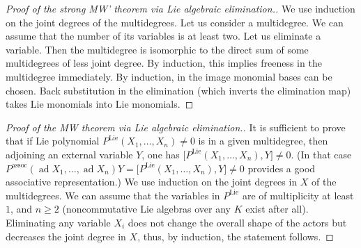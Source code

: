 \documentclass[11pt,a4paper]{amsart}
\DeclareMathOperator{\Lie}{Lie}
\DeclareMathOperator{\ad}{ad}
\newcommand{\bo}{\boldsymbol}
\newcommand{\ass}{\mathrm{assoc}}
\theoremstyle{definition}
\theoremstyle{plain}
\begin{document}
\begin{proof}[Proof of the strong MW'  theorem via Lie algebraic elimination.]
We use induction on the joint degrees of the multidegrees.
Let us consider a multidegree.
We can assume that the number of its variables is at least two.
Let us eliminate a variable.
Then the multidegree is isomorphic to the direct sum of some multidegrees of less joint degree.
By induction, this implies freeness in the multidegree immediately.
By induction, in the image monomial bases can be chosen.
Back substitution in the elimination (which inverts the elimination map) takes Lie monomials into Lie monomials.
\end{proof}

\begin{proof}[Proof of the MW  theorem via Lie algebraic elimination.]
It is sufficient to prove that if Lie polynomial $P^{\Lie}(X_1,\ldots,X_n)\neq 0$ is  in a given multidegree,
 then adjoining an external variable $Y$, one has $\bo[P^{\Lie}(X_1,\ldots,X_n),Y\bo]\neq 0$.
(In that case $P^{\ass}(\ad X_1,\ldots,\ad X_n)Y=\bo[P^{\Lie}(X_1,\ldots,X_n),Y\bo]\neq 0$
 provides a good associative representation.)
We use induction on the joint degrees in $X$ of the multidegrees.
We can assume that the variables in $P^{\Lie}$ are of multiplicity at least $1$, and $n\geq2$
 (noncommutative Lie algebras over any $K$ exist after all).
Eliminating any variable $X_i$ does not change the overall shape of the actors but decreases the
 joint degree in $X$, thus, by induction, the statement follows.
\end{proof}
\end{document}

